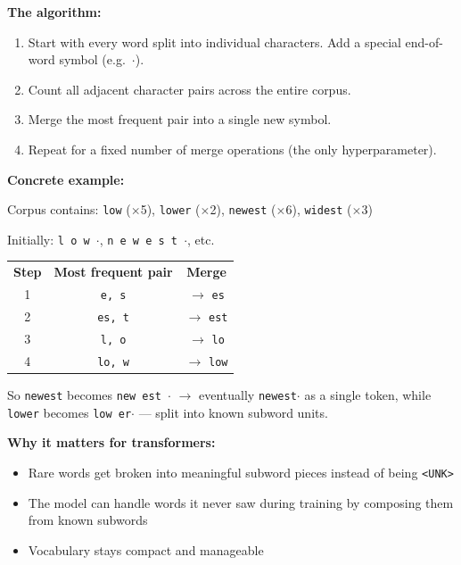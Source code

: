 \noindent\textbf{The algorithm:}

\begin{enumerate}
\item Start with every word split into individual characters. Add a special end-of-word symbol (e.g.\ \texttt{$\cdot$}).
\item Count all adjacent character pairs across the entire corpus.
\item Merge the most frequent pair into a single new symbol.
\item Repeat for a fixed number of merge operations (the only hyperparameter).
\end{enumerate}

\noindent\textbf{Concrete example:}

Corpus contains: \texttt{low} ($\times$5), \texttt{lower} ($\times$2), \texttt{newest} ($\times$6), \texttt{widest} ($\times$3)

Initially: \texttt{l o w $\cdot$}, \texttt{n e w e s t $\cdot$}, etc.

\begin{center}
\begin{tabular}{c|c|c}
\textbf{Step} & \textbf{Most frequent pair} & \textbf{Merge} \\
1 & \texttt{e, s} & $\to$ \texttt{es} \\
2 & \texttt{es, t} & $\to$ \texttt{est} \\
3 & \texttt{l, o} & $\to$ \texttt{lo} \\
4 & \texttt{lo, w} & $\to$ \texttt{low} \\
\end{tabular}
\end{center}

So \texttt{newest} becomes \texttt{new est $\cdot$} $\to$ eventually \texttt{newest$\cdot$} as a single token, while \texttt{lower} becomes \texttt{low er$\cdot$} --- split into known subword units.

\noindent\textbf{Why it matters for transformers:}

\begin{itemize}
\item Rare words get broken into meaningful subword pieces instead of being \texttt{<UNK>}
\item The model can handle words it never saw during training by composing them from known subwords
\item Vocabulary stays compact and manageable
\end{itemize}

